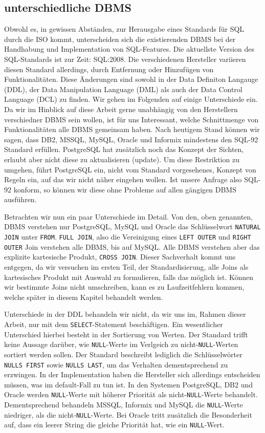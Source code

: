 \subsection{unterschiedliche DBMS}

Obwohl es, in gewissen Abständen, zur Herausgabe eines Standards für SQL durch die ISO kommt, unterscheiden sich die existierenden DBMS bei der Handhabung und Implementation von SQL-Features. Die aktuellste Version des SQL-Standards ist zur Zeit: SQL:2008. Die verschiedenen Hersteller variieren diesen Standard allerdings, durch Entfernung oder Hinzufügen von Funktionalitäten. Diese Änderungen sind sowohl in der Data Definiton Langauge (DDL), der Data Manipulation Language (DML) als auch der Data Control Language (DCL) zu finden. Wir gehen im Folgenden auf einige Unterschiede ein. Da wir im Hinblick auf diese Arbeit gerne unabhängig von den Herstellern verschiedner DBMS sein wollen, ist für uns Interessant, welche Schnittmenge von Funktionalitäten alle DBMS gemeinsam haben. Nach heutigem Stand können wir sagen, dass DB2, MSSQL, MySQL, Oracle und Informix mindestens den SQL-92 Standard erfüllen. PostgreSQL hat zusätzlich noch das Konzept der Sichten, erlaubt aber nicht diese zu aktualisieren (update). Um diese Restriktion zu umgehen, führt PostgreSQL ein, nicht vom Standard vorgesehenes, Konzept von Regeln ein, auf das wir nicht näher eingehen wollen. Ist unsere Anfrage also SQL-92 konform, so können wir diese ohne Probleme auf allen gängigen DBMS ausführen.

Betrachten wir nun ein paar Unterschiede im Detail. Von den, oben genannten, DBMS verstehen nur PostgreSQL, MySQL und Oracle das Schlüsselwort \verb|NATURAL JOIN| unter \verb|FROM|. \verb|FULL JOIN|, also die Vereinigung eines \verb|LEFT OUTER| und \verb|RIGHT OUTER| Join verstehen alle DBMS, bis auf MySQL. Alle DBMS verstehen aber das explizite kartesische  Produkt, \verb|CROSS JOIN|. Dieser Sachverhalt kommt uns entgegen, da wir versuchen im ersten Teil, der Standardisierung, alle Joins als kartesisches Produkt mit Auswahl zu formulieren, falls das möglich ist. Können wir bestimmte Joins nicht umschreiben, kann es zu Laufzeitfehlern kommen, welche später in diesem Kapitel behandelt werden.

Unterschiede in der DDL behandeln wir nicht, da wir uns im, Rahmen dieser Arbeit, nur mit dem \verb|SELECT|-Statement beschäftigen. Ein wesentlicher Unterschied hierbei besteht in der Sortierung von Werten. Der Standard trifft keine Aussage darüber, wie \verb|NULL|-Werte im Verlgeich zu nicht-\verb|NULL|-Werten sortiert werden sollen. Der Standard beschreibt lediglich die Schlüsselwörter \verb|NULLS FIRST| sowie \verb|NULLS LAST|, um das Verhalten dementsprechend zu erzwingen. In der Implementation haben die Hersteller sich allerdings entscheiden müssen, was im default-Fall zu tun ist. In den Systemen PostgreSQL, DB2 und Oracle werden \verb|NULL|-Werte mit höherer Priorität als nicht-\verb|NULL|-Werte behandelt. Dementsprechend behandeln MSSQL, Informix und MySQL die \verb|NULL|-Werte niedriger, als die nicht-\verb|NULL|-Werte. Bei Oracle tritt zusätzlich die Besonderheit auf, dass ein leerer String die gleiche Priorität hat, wie ein \verb|NULL|-Wert. 

